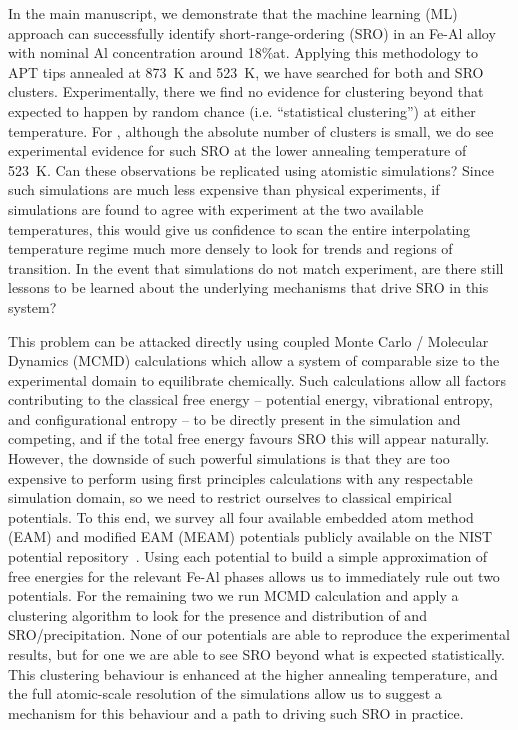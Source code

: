 In the main manuscript, we demonstrate that the machine learning (ML) approach can successfully identify short-range-ordering (SRO) in an Fe-Al alloy with nominal Al concentration around 18\%at.
Applying this methodology to APT tips annealed at 873~K and 523~K, we have searched for both \DOTHREE and \BTWO SRO clusters.
Experimentally, there we find no evidence for \DOTHREE clustering beyond that expected to happen by random chance (i.e. ``statistical clustering'') at either temperature.
For \BTWO, although the absolute number of clusters is small, we do see experimental evidence for such SRO at the lower annealing temperature of 523~K.
Can these observations be replicated using atomistic simulations?
Since such simulations are much less expensive than physical experiments, if simulations are found to agree with experiment at the two available temperatures, this would give us confidence to scan the entire interpolating temperature regime much more densely to look for trends and regions of transition.
In the event that simulations do not match experiment, are there still lessons to be learned about the underlying mechanisms that drive SRO in this system?

This problem can be attacked directly using coupled Monte Carlo / Molecular Dynamics (MCMD) calculations which allow a system of comparable size to the experimental domain to equilibrate chemically.
Such calculations allow all factors contributing to the classical free energy -- potential energy, vibrational entropy, and configurational entropy -- to be directly present in the simulation and competing, and if the total free energy favours SRO this will appear naturally.
However, the downside of such powerful simulations is that they are too expensive to perform using first principles calculations with any respectable simulation domain, so we need to restrict ourselves to classical empirical potentials.
To this end, we survey all four available embedded atom method (EAM) and modified EAM (MEAM) potentials publicly available on the NIST potential repository~\cite{nist}.
Using each potential to build a simple approximation of free energies for the relevant Fe-Al phases allows us to immediately rule out two potentials.
For the remaining two we run MCMD calculation and apply a clustering algorithm to look for the presence and distribution of \DOTHREE and \BTWO SRO/precipitation.
None of our potentials are able to reproduce the experimental results, but for one we are able to see \DOTHREE SRO beyond what is expected statistically.
This clustering behaviour is enhanced at the higher annealing temperature, and the full atomic-scale resolution of the simulations allow us to suggest a mechanism for this behaviour and a path to driving such SRO in practice.
